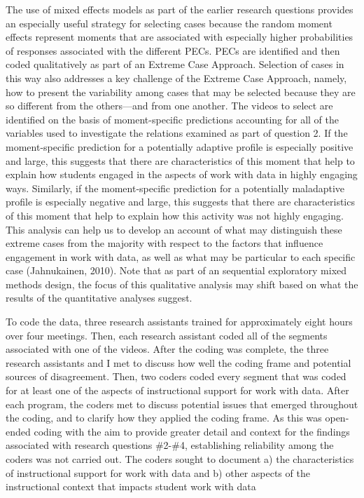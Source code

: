 \documentclass[]{msu-thesis}
\theoremstyle{definition}
\theoremstyle{definition}
\theoremstyle{definition}
\theoremstyle{remark}
\begin{document}
The use of mixed effects models as part of the earlier research
questions provides an especially useful strategy for selecting cases
because the random moment effects represent moments that are associated
with especially higher probabilities of responses associated with the
different PECs. PECs are identified and then coded qualitatively as part
of an Extreme Case Approach. Selection of cases in this way also
addresses a key challenge of the Extreme Case Approach, namely, how to
present the variability among cases that may be selected because they
are so different from the others---and from one another. The videos to
select are identified on the basis of moment-specific predictions
accounting for all of the variables used to investigate the relations
examined as part of question 2. If the moment-specific prediction for a
potentially adaptive profile is especially positive and large, this
suggests that there are characteristics of this moment that help to
explain how students engaged in the aspects of work with data in highly
engaging ways. Similarly, if the moment-specific prediction for a
potentially maladaptive profile is especially negative and large, this
suggests that there are characteristics of this moment that help to
explain how this activity was not highly engaging. This analysis can
help us to develop an account of what may distinguish these extreme
cases from the majority with respect to the factors that influence
engagement in work with data, as well as what may be particular to each
specific case (Jahnukainen, 2010). Note that as part of an sequential
exploratory mixed methods design, the focus of this qualitative analysis
may shift based on what the results of the quantitative analyses
suggest.

To code the data, three research assistants trained for approximately
eight hours over four meetings. Then, each research assistant coded all
of the segments associated with one of the videos. After the coding was
complete, the three research assistants and I met to discuss how well
the coding frame and potential sources of disagreement. Then, two coders
coded every segment that was coded for at least one of the aspects of
instructional support for work with data. After each program, the coders
met to discuss potential issues that emerged throughout the coding, and
to clarify how they applied the coding frame. As this was open-ended
coding with the aim to provide greater detail and context for the
findings associated with research questions \#2-\#4, establishing
reliability among the coders was not carried out. The coders sought to
document a) the characteristics of instructional support for work with
data and b) other aspects of the instructional context that impacts
student work with data
\end{document}
